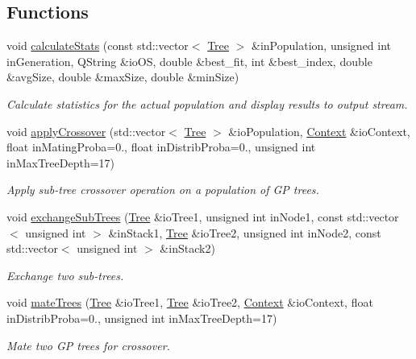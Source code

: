 \subsection*{Functions}
\begin{DoxyCompactItemize}
\item 
void \hyperlink{group__Puppy_gaaef144c802e721c9f3ef0a53b8728d3d}{calculate\+Stats} (const std\+::vector$<$ \hyperlink{classPuppy_1_1Tree}{Tree} $>$ \&in\+Population, unsigned int in\+Generation, Q\+String \&io\+O\+S, double \&best\+\_\+fit, int \&best\+\_\+index, double \&avg\+Size, double \&max\+Size, double \&min\+Size)
\begin{DoxyCompactList}\small\item\em Calculate statistics for the actual population and display results to output stream. \end{DoxyCompactList}\item 
void \hyperlink{group__Puppy_ga3ae29733ace7314f669f288e6f2d4a8d}{apply\+Crossover} (std\+::vector$<$ \hyperlink{classPuppy_1_1Tree}{Tree} $>$ \&io\+Population, \hyperlink{classPuppy_1_1Context}{Context} \&io\+Context, float in\+Mating\+Proba=0., float in\+Distrib\+Proba=0., unsigned int in\+Max\+Tree\+Depth=17)
\begin{DoxyCompactList}\small\item\em Apply sub-\/tree crossover operation on a population of G\+P trees. \end{DoxyCompactList}\item 
void \hyperlink{group__Puppy_gac9ce564e7c3a601bc7cb9f39def4cfc4}{exchange\+Sub\+Trees} (\hyperlink{classPuppy_1_1Tree}{Tree} \&io\+Tree1, unsigned int in\+Node1, const std\+::vector$<$ unsigned int $>$ \&in\+Stack1, \hyperlink{classPuppy_1_1Tree}{Tree} \&io\+Tree2, unsigned int in\+Node2, const std\+::vector$<$ unsigned int $>$ \&in\+Stack2)
\begin{DoxyCompactList}\small\item\em Exchange two sub-\/trees. \end{DoxyCompactList}\item 
void \hyperlink{group__Puppy_gae78df624fa96e33eaf9896ae00ea13cd}{mate\+Trees} (\hyperlink{classPuppy_1_1Tree}{Tree} \&io\+Tree1, \hyperlink{classPuppy_1_1Tree}{Tree} \&io\+Tree2, \hyperlink{classPuppy_1_1Context}{Context} \&io\+Context, float in\+Distrib\+Proba=0., unsigned int in\+Max\+Tree\+Depth=17)
\begin{DoxyCompactList}\small\item\em Mate two G\+P trees for crossover. \end{DoxyCompactList}\item 

\end{DoxyCompactItemize}
